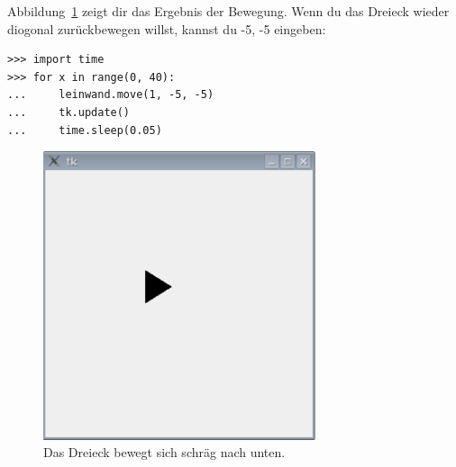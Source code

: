 Abbildung~\ref{fig45} zeigt dir das Ergebnis der Bewegung. Wenn du das Dreieck wieder diogonal zurückbewegen willst, kannst du -5, -5 eingeben:

\begin{Verbatim}[frame=single]
>>> import time
>>> for x in range(0, 40):
...     leinwand.move(1, -5, -5)
...     tk.update()
...     time.sleep(0.05)
\end{Verbatim}

\begin{figure}
\begin{center}
\includegraphics[width=80mm]{images/figure45}
\end{center}
\caption{Das Dreieck bewegt sich schräg nach unten.}\label{fig45}
\end{figure}


